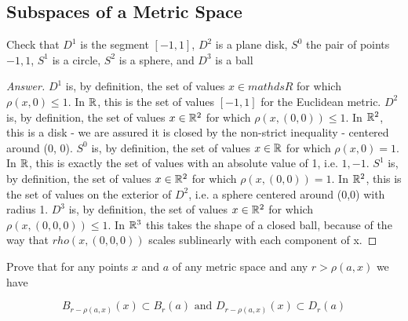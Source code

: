 \subsection{Subspaces of a Metric Space}
\begin{majorEx}%
Check that $D^1$ is the segment $[-1, 1]$, $D^2$ is a plane disk, $S^0$ the pair of points ${-1, 1}$, $S^1$ is a circle, $S^2$ is a sphere, and $D^3$ is a ball
\end{majorEx}
\begin{proof}[Answer]
$D^1$ is, by definition, the set of values $x \in mathds{R}$ for which $\rho (x, 0) \leq 1$. In $\mathbb{R}$, this is the set of values $[-1, 1]$ for the Euclidean metric.
$D^2$ is, by definition, the set of values $x \in \mathbb{R}^2$ for which $\rho (x, (0, 0)) \leq 1$. In $\mathbb{R}^2$, this is a disk - we are assured it is closed by the non-strict inequality - centered around (0, 0).
$S^0$ is, by definition, the set of values $x \in \mathbb{R}$ for which $\rho (x, 0) = 1$. In $\mathbb{R}$, this is exactly the set of values with an absolute value of 1, i.e. ${1, -1}$.
$S^1$ is, by definition, the set of values $x \in \mathbb{R}^2$ for which $\rho (x, (0, 0)) = 1$. In $\mathbb{R}^2$, this is the set of values on the exterior of $D^2$, i.e. a sphere centered around (0,0) with radius 1.
$D^3$ is, by definition, the set of values $x \in \mathbb{R}^2$ for which $\rho (x, (0, 0, 0)) \leq 1$. In $\mathbb{R}^3$ this takes the shape of a closed ball, because of the way that $rho (x, (0, 0, 0))$ scales sublinearly with each component of x.
\end{proof}

\begin{majorEx}%
  Prove that for any points $x$ and $a$ of any metric space and any $r
  > \rho(a,x)$ we have

  $$B_{r-\rho(a,x)}(x) \subset B_r(a) \text{  and  }
  D_{r-\rho(a,x)}(x) \subset D_r(a)$$
\end{majorEx}

